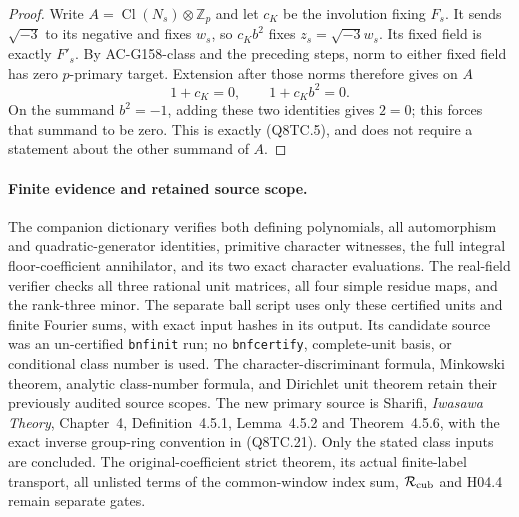 \begin{proof}
Write $A=\operatorname{Cl}(N_s)\otimes\mathbb Z_p$ and let
$c_K$ be the involution fixing $F_s$.
It sends $\sqrt{-3}$ to its negative and fixes $w_s$, so
$c_Kb^2$ fixes $z_s=\sqrt{-3}w_s$.
Its fixed field is exactly $F'_s$.
By AC-G158-class and the preceding steps, norm to either fixed
field has zero $p$-primary target.
Extension after those norms therefore gives on $A$
\[
                       1+c_K=0,\qquad 1+c_Kb^2=0.
 \tag{Q8TC.24}
\]
On the summand $b^2=-1$, adding these two identities gives
$2=0$; this forces that summand to be zero.
This is exactly (Q8TC.5), and does not require a statement
about the other summand of $A$.
\end{proof}

\paragraph{Finite evidence and retained source scope.}
The companion dictionary verifies both defining polynomials,
all automorphism and quadratic-generator identities, primitive
character witnesses, the full integral floor-coefficient
annihilator, and its two exact character evaluations.
The real-field verifier checks all three rational unit matrices,
all four simple residue maps, and the rank-three minor.
The separate ball script uses only these certified units and
finite Fourier sums, with exact input hashes in its output.
Its candidate source was an un-certified \texttt{bnfinit} run;
no \texttt{bnfcertify}, complete-unit basis, or conditional class
number is used.
The character-discriminant formula, Minkowski theorem, analytic
class-number formula, and Dirichlet unit theorem retain their
previously audited source scopes.
The new primary source is Sharifi, \emph{Iwasawa Theory},
Chapter~4, Definition~4.5.1, Lemma~4.5.2 and Theorem~4.5.6,
with the exact inverse group-ring convention in (Q8TC.21).
Only the stated class inputs are concluded.
The original-coefficient strict theorem, its actual finite-label
transport, all unlisted terms of the common-window index sum,
$\mathcal R_{\rm cub}$ and H04.4 remain separate gates.

